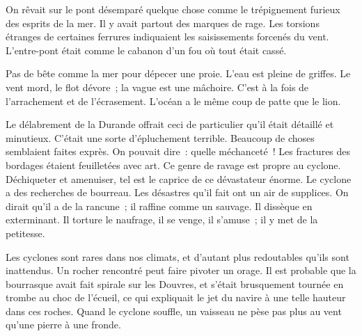 \documentclass[french,twoside]{book} %
\begin{document}
 On rêvait sur le pont désemparé quelque chose comme le trépignement furieux des esprits de la mer. Il y avait partout des marques de rage. Les torsions étranges de certaines ferrures indiquaient les saisissements forcenés du vent. L’entre-pont était comme le cabanon d’un fou où tout était cassé.\par
Pas de bête comme la mer pour dépecer une proie. L’eau est pleine de griffes. Le vent mord, le flot dévore ; la vague est une mâchoire. C’est à la fois de l’arrachement et de l’écrasement. L’océan a le même coup de patte que le lion.\par
Le délabrement de la Durande offrait ceci de particulier qu’il était détaillé et minutieux. C’était une sorte d’épluchement terrible. Beaucoup de choses semblaient faites exprès. On pouvait dire : quelle méchanceté ! Les fractures des bordages étaient feuilletées avec art. Ce genre de ravage est propre au cyclone. Déchiqueter et amenuiser, tel est le caprice de ce dévastateur énorme. Le cyclone a des recherches de bourreau. Les désastres qu’il fait ont un air de supplices. On dirait qu’il a de la rancune ; il raffine comme un sauvage. Il dissèque en exterminant. Il torture le naufrage, il se venge, il s’amuse ; il y met de la petitesse.\par
Les cyclones sont rares dans nos climats, et d’autant plus redoutables qu’ils sont inattendus. Un rocher rencontré peut faire pivoter un orage. Il est probable que la bourrasque avait fait spirale sur les Douvres, et s’était brusquement tournée en trombe au choc de l’écueil, ce qui expliquait le jet du navire à une telle  hauteur dans ces roches. Quand le cyclone souffle, un vaisseau ne pèse pas plus au vent qu’une pierre à une fronde.\par
\end{document}
